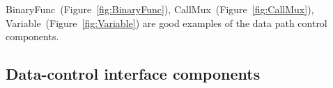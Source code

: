 BinaryFunc~(Figure~\ref{fig:BinaryFunc}), CallMux~(Figure~\ref{fig:CallMux}),
Variable~(Figure~\ref{fig:Variable}) are good examples of the data
path control components.


\subsection{Data-control interface components}

\begin{figure}
\begin{raggedright}
\par\end{raggedright}


\end{figure}
